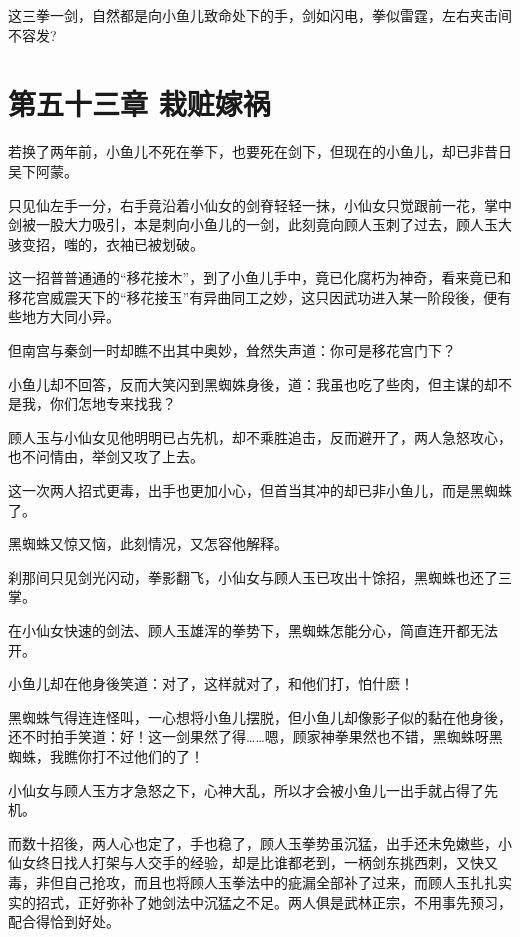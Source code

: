 \documentclass[12pt,oneside]{book}
\begin{document}
这三拳一剑，自然都是向小鱼儿致命处下的手，剑如闪电，拳似雷霆，左右夹击间不容发?

\hypertarget{ux7b2cux4e94ux5341ux4e09ux7ae0-ux683dux8d43ux5ac1ux7978}{%
\chapter{第五十三章
栽赃嫁祸}\label{ux7b2cux4e94ux5341ux4e09ux7ae0-ux683dux8d43ux5ac1ux7978}}

若换了两年前，小鱼儿不死在拳下，也要死在剑下，但现在的小鱼儿，却已非昔日吴下阿蒙。

只见仙左手一分，右手竟沿着小仙女的剑脊轻轻一抹，小仙女只觉跟前一花，掌中剑被一股大力吸引，本是刺向小鱼儿的一剑，此刻竟向顾人玉刺了过去，顾人玉大骇变招，嗤的，衣袖已被划破。

这一招普普通通的``移花接木''，到了小鱼儿手中，竟已化腐朽为神奇，看来竟已和移花宫威震天下的``移花接玉''有异曲同工之妙，这只因武功进入某一阶段後，便有些地方大同小异。

但南宫与秦剑一时却瞧不出其中奥妙，耸然失声道：你可是移花宫门下？

小鱼儿却不回答，反而大笑闪到黑蜘姝身後，道：我虽也吃了些肉，但主谋的却不是我，你们怎地专来找我？

顾人玉与小仙女见他明明已占先机，却不乘胜追击，反而避开了，两人急怒攻心，也不问情由，举剑又攻了上去。

这一次两人招式更毒，出手也更加小心，但首当其冲的却已非小鱼儿，而是黑蜘蛛了。

黑蜘蛛又惊又恼，此刻情况，又怎容他解释。

刹那间只见剑光闪动，拳影翻飞，小仙女与顾人玉已攻出十馀招，黑蜘蛛也还了三掌。

在小仙女快速的剑法、顾人玉雄浑的拳势下，黑蜘蛛怎能分心，简直连开都无法开。

小鱼儿却在他身後笑道：对了，这样就对了，和他们打，怕什麽！

黑蜘蛛气得连连怪叫，一心想将小鱼儿摆脱，但小鱼儿却像影子似的黏在他身後，还不时拍手笑道：好！这一剑果然了得\ldots\ldots 嗯，顾家神拳果然也不错，黑蜘蛛呀黑蜘蛛，我瞧你打不过他们的了！

小仙女与顾人玉方才急怒之下，心神大乱，所以才会被小鱼儿一出手就占得了先机。

而数十招後，两人心也定了，手也稳了，顾人玉拳势虽沉猛，出手还未免嫩些，小仙女终日找人打架与人交手的经验，却是比谁都老到，一柄剑东挑西刺，又快又毒，非但自己抢攻，而且也将顾人玉拳法中的疵漏全部补了过来，而顾人玉扎扎实实的招式，正好弥补了她剑法中沉猛之不足。两人俱是武林正宗，不用事先预习，配合得恰到好处。
\end{document}

